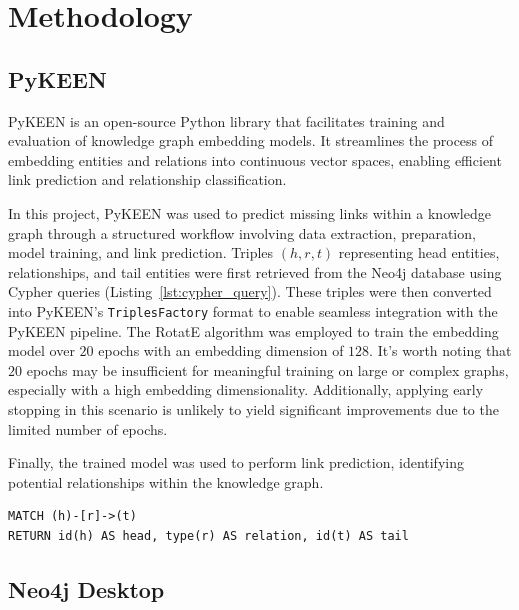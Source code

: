 \section*{Methodology}

\subsection*{PyKEEN}


PyKEEN \cite{pykeen} is an open-source Python library that facilitates training and evaluation of knowledge graph embedding models. It streamlines the process of embedding entities and relations into continuous vector spaces, enabling efficient link prediction and relationship classification.


In this project, PyKEEN was used to predict missing links within a knowledge graph through a structured workflow involving data extraction, preparation, model training, and link prediction. Triples $(h, r, t)$ representing head entities, relationships, and tail entities were first retrieved from the Neo4j database using Cypher queries (Listing~\ref{lst:cypher_query}). These triples were then converted into PyKEEN's \texttt{TriplesFactory} format to enable seamless integration with the PyKEEN pipeline. The RotatE algorithm was employed to train the embedding model over $20$ epochs with an embedding dimension of $128$. It's worth noting that $20$ epochs may be insufficient for meaningful training on large or complex graphs, especially with a high embedding dimensionality. Additionally, applying early stopping in this scenario is unlikely to yield significant improvements due to the limited number of epochs.

Finally, the trained model was used to perform link prediction, identifying potential relationships within the knowledge graph.

\begin{lstlisting}[caption=Cypher query to retrieve triples., label=lst:cypher_query]
MATCH (h)-[r]->(t)
RETURN id(h) AS head, type(r) AS relation, id(t) AS tail
\end{lstlisting}

\subsection*{Neo4j Desktop}

